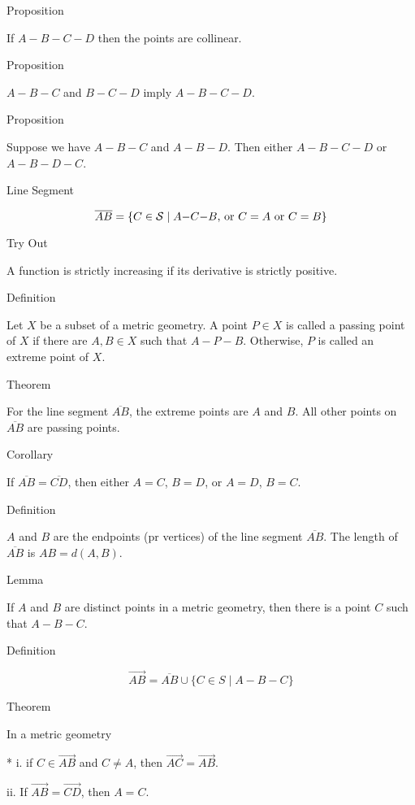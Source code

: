  Proposition

If $A{-}B{-}C{-}D$ then the points are collinear.

 Proposition

$A{-}B{-}C$ and $B{-}C{-}D$ imply $A{-}B{-}C{-}D$.

 Proposition

Suppose we have $A{-}B{-}C$ and $A{-}B{-}D$.
Then either $A{-}B{-}C{-}D$ or $A{-}B{-}D{-}C$.

 Line Segment

$$\overline{AB}=\{C\in{\cal S}\mid A{-}C{-}B\hbox{, or $C=A$ or $C=B$}\}$$

 Try Out

A function is strictly increasing if its derivative is strictly positive.

 Definition

Let $X$ be a subset of a metric geometry.
A point $P\in X$ is called a passing point of $X$ if there are $A,B\in X$
such that $A{-}P{-}B$.
Otherwise, $P$ is called an extreme point of $X$.

 Theorem

For the line segment $\overline{AB}$, the extreme points are $A$ and $B$.
All other points on $\overline{AB}$ are passing points.

 Corollary

If $\overline{AB}=\overline{CD}$, then either $A=C$, $B=D$, or $A=D$, $B=C$.

 Definition

$A$ and $B$ are the endpoints (pr vertices) of the line segment $\overline{AB}$.
The length of $\overline{AB}$ is $AB=d(A,B)$.

 Lemma

If $A$ and $B$ are distinct points in a metric geometry, then there is a point
$C$ such that $A{-}B{-}C$.

 Definition

$$\overrightarrow{AB}=\overline{AB}\cup\{C\in S\mid A{-}B{-}C\}$$

 Theorem

In a metric geometry
\item{* i.} if $C\in\overrightarrow{AB}$ and $C\ne A$, then $\overrightarrow{AC}=\overrightarrow{AB}$.
\item{ii.} If $\overrightarrow{AB}=\overrightarrow{CD}$, then $A=C$.

